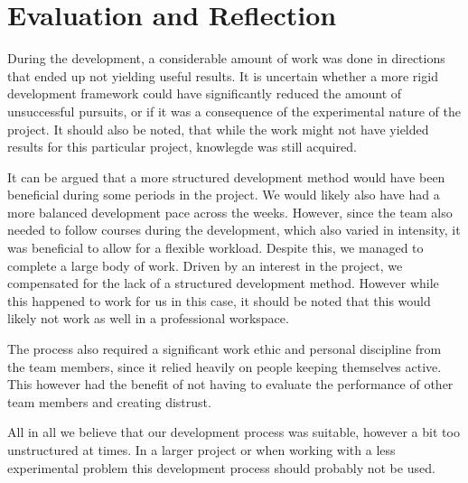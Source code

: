 \section{Evaluation and Reflection}
During the development, a considerable amount of work was done in directions that ended up not yielding useful results. It is uncertain whether a more rigid development framework could have significantly reduced the amount of unsuccessful pursuits, or if it was a consequence of the experimental nature of the project. It should also be noted, that while the work might not have yielded results for this particular project, knowlegde was still acquired.

It can be argued that a more structured development method would have been beneficial during some periods in the project. We would likely also have had a more balanced development pace across the weeks. However, since the team also needed to follow courses during the development, which also varied in intensity, it was beneficial to allow for a flexible workload.
Despite this, we managed to complete a large body of work. Driven by an interest in the project, we compensated for the lack of a structured development method. However while this happened to work for us in this case, it should be noted that this would likely not work as well in a professional workspace.

The process also required a significant work ethic and personal discipline from the team members, since it relied heavily on people keeping themselves active. This however had the benefit of not having to evaluate the performance of other team members and creating distrust.

All in all we believe that our development process was suitable, however a bit too unstructured at times. In a larger project or when working with a less experimental problem this development process should probably not be used.



